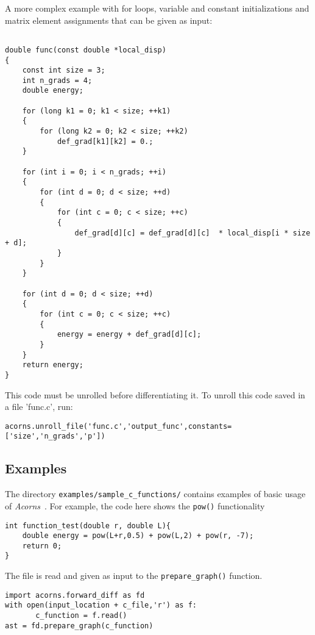 \documentclass[a4,oneside]{book}
\def\codesize{\small}
\def\Acorns{\emph{Acorns}}
\def\code#1{{\codesize\texttt{#1}}}
\begin{document}
A more complex example with for loops, variable and constant initializations and matrix element assignments that can be given as input:

\begin{lstlisting}

double func(const double *local_disp)
{
    const int size = 3;
    int n_grads = 4;
    double energy;

    for (long k1 = 0; k1 < size; ++k1)
    {
        for (long k2 = 0; k2 < size; ++k2)
            def_grad[k1][k2] = 0.;
    }

    for (int i = 0; i < n_grads; ++i)
    {
        for (int d = 0; d < size; ++d)
        {
            for (int c = 0; c < size; ++c)
            {
                def_grad[d][c] = def_grad[d][c]  * local_disp[i * size + d];
            }
        }
    }    
    
    for (int d = 0; d < size; ++d)
    {
        for (int c = 0; c < size; ++c)
        {
            energy = energy + def_grad[d][c];
        }
    }    
    return energy;
}    
\end{lstlisting}


This code must be unrolled before differentiating it. To unroll this code saved in a file 'func.c', run:
\begin{lstlisting}
acorns.unroll_file('func.c','output_func',constants=['size','n_grads','p'])
\end{lstlisting}



\subsection{Examples}
\label{sec:examples}

The directory \code{examples/sample\_c\_functions/} contains examples of basic usage of \Acorns\ . For example, the code here shows the \code{pow()} functionality

\begin{lstlisting}
int function_test(double r, double L){ 
    double energy = pow(L+r,0.5) + pow(L,2) + pow(r, -7); 
    return 0; 
}
\end{lstlisting}

The file is read and given as input to the \code{prepare\_graph()} function.

\begin{lstlisting}
import acorns.forward_diff as fd
with open(input_location + c_file,'r') as f:
       c_function = f.read()
ast = fd.prepare_graph(c_function)
\end{lstlisting}
\end{document}
